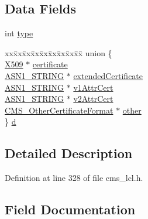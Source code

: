 \subsection*{Data Fields}
\begin{DoxyCompactItemize}
\item 
int \hyperlink{struct_c_m_s___certificate_choices_ac765329451135abec74c45e1897abf26}{type}
\item 
\begin{tabbing}
xx\=xx\=xx\=xx\=xx\=xx\=xx\=xx\=xx\=\kill
union \{\\
\>\hyperlink{crypto_2ossl__typ_8h_a4f666bde6518f95deb3050c54b408416}{X509} $\ast$ \hyperlink{struct_c_m_s___certificate_choices_ac130c045af9259b1075263ec517ef59d}{certificate}\\
\>\hyperlink{crypto_2ossl__typ_8h_ad37610875e38aa6c59f5e6e0b437e65c}{ASN1\_STRING} $\ast$ \hyperlink{struct_c_m_s___certificate_choices_a5919590fd28bef88d752482f9ce5c1be}{extendedCertificate}\\
\>\hyperlink{crypto_2ossl__typ_8h_ad37610875e38aa6c59f5e6e0b437e65c}{ASN1\_STRING} $\ast$ \hyperlink{struct_c_m_s___certificate_choices_af5bd602f5351a204150b9c4a846e74a7}{v1AttrCert}\\
\>\hyperlink{crypto_2ossl__typ_8h_ad37610875e38aa6c59f5e6e0b437e65c}{ASN1\_STRING} $\ast$ \hyperlink{struct_c_m_s___certificate_choices_a16f0568e1d320b43b8b46e6271bf9ef4}{v2AttrCert}\\
\>\hyperlink{cms__lcl_8h_a607e2c91e4e68db49d0ccaa97ce5d7c1}{CMS\_OtherCertificateFormat} $\ast$ \hyperlink{struct_c_m_s___certificate_choices_aff6e4aa8f7b4459b6977900ca9716f79}{other}\\
\} \hyperlink{struct_c_m_s___certificate_choices_ae8dc97c208ec1907c0d30920d1cb3dcb}{d}\\

\end{tabbing}\end{DoxyCompactItemize}


\subsection{Detailed Description}


Definition at line 328 of file cms\+\_\+lcl.\+h.



\subsection{Field Documentation}
